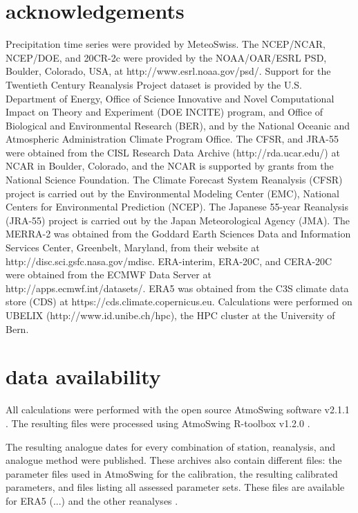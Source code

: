 \documentclass[alpha-refs]{wiley-article}
\begin{document}
\section*{acknowledgements}
Precipitation time series were provided by MeteoSwiss. The NCEP/NCAR, NCEP/DOE, and 20CR-2c were provided by the NOAA/OAR/ESRL PSD, Boulder, Colorado, USA, at http://www.esrl.noaa.gov/psd/. Support for the Twentieth Century Reanalysis Project dataset is provided by the U.S. Department of Energy, Office of Science Innovative and Novel Computational Impact on Theory and Experiment (DOE INCITE) program, and Office of Biological and Environmental Research (BER), and by the National Oceanic and Atmospheric Administration Climate Program Office. The CFSR, and JRA-55 were obtained from the CISL Research Data Archive (http://rda.ucar.edu/) at NCAR in Boulder, Colorado, and the NCAR is supported by grants from the National Science Foundation. The Climate Forecast System Reanalysis (CFSR) project is carried out by the Environmental Modeling Center (EMC), National Centers for Environmental Prediction (NCEP). The Japanese 55-year Reanalysis (JRA-55) project is carried out by the Japan Meteorological Agency (JMA). The MERRA-2 was obtained from the Goddard Earth Sciences Data and Information Services Center, Greenbelt, Maryland, from their website at http://disc.sci.gsfc.nasa.gov/mdisc. ERA-interim, ERA-20C, and CERA-20C were obtained from the ECMWF Data Server at http://apps.ecmwf.int/datasets/. ERA5 was obtained from the C3S climate data store (CDS) at https://cds.climate.copernicus.eu. Calculations were performed on UBELIX (http://www.id.unibe.ch/hpc), the HPC cluster at the University of Bern.


\section*{data availability}
All calculations were performed with the open source AtmoSwing software v2.1.1 \citep{Horton2019c}. The resulting files were processed using AtmoSwing R-toolbox v1.2.0 \citep{Horton2018d}.

The resulting analogue dates for every combination of station, reanalysis, and analogue method were published. These archives also contain different files: the parameter files used in AtmoSwing for the calibration, the resulting calibrated parameters, and files listing all assessed parameter sets. These files are available for ERA5 (...) and the other reanalyses \citep[see references in][]{Horton2018b}.
\end{document}
